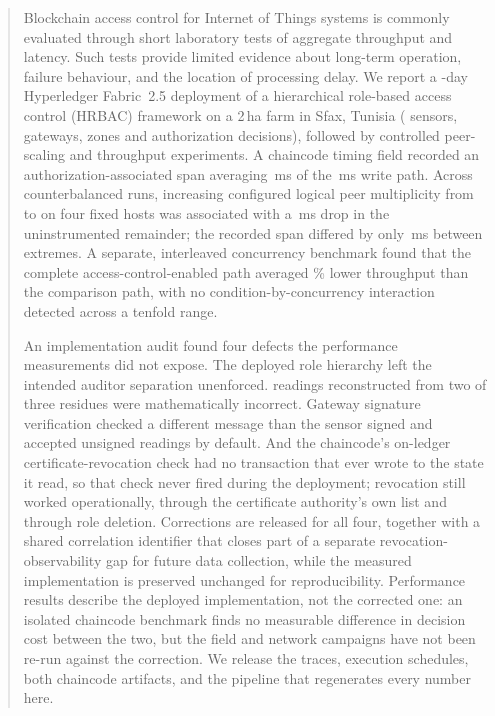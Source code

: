 \documentclass[a4paper,fleqn]{cas-sc}
\begin{document}
\begin{abstract}
Blockchain access control for Internet of Things systems is commonly
evaluated through short laboratory tests of aggregate throughput and
latency. Such tests provide limited evidence about long-term operation,
failure behaviour, and the location of processing delay. We report a
\DeployDays-day
Hyperledger Fabric~2.5 deployment of a hierarchical role-based access
control (HRBAC) framework on a 2\,ha farm in Sfax, Tunisia
(\DeploySensors{} sensors, \DeployGateways{} gateways, \DeployZones{}
zones and \TotalDecisions{} authorization decisions), followed by
controlled peer-scaling and throughput experiments. A chaincode
timing field recorded an authorization-associated span averaging
\PartAccess\,ms of the \PartTotal\,ms write path. Across
\PartRunsPerConfig{} counterbalanced runs, increasing configured logical
peer multiplicity from \ScaleMinPeers{} to \ScaleMaxPeers{} on four fixed
hosts was associated with a \PartEndorser\,ms drop in the uninstrumented
remainder; the recorded span differed by only \PartTostDiff\,ms between
extremes. A separate, interleaved concurrency benchmark
found that the complete access-control-enabled path averaged
\OverheadMeanPct\% lower throughput than the comparison path, with no
condition-by-concurrency interaction detected across a tenfold range.

An implementation audit found four defects the performance measurements did
not expose. The deployed role hierarchy left the intended auditor
separation unenforced. \CRTRecovered{} readings reconstructed from two of
three residues were mathematically incorrect. Gateway signature
verification checked a different message than the sensor signed and
accepted unsigned readings by default. And the chaincode's on-ledger
certificate-revocation check had no transaction that ever wrote to the
state it read, so that check never fired during the deployment; revocation
still worked operationally, through the certificate authority's own list
and through role deletion. Corrections are released for all four, together
with a shared correlation identifier that closes part of a separate
revocation-observability gap for future data collection, while the measured
implementation is preserved unchanged for reproducibility. Performance
results describe the deployed implementation, not the corrected one: an
isolated chaincode benchmark finds no measurable difference in decision
cost between the two, but the field and network campaigns have not been
re-run against the correction. We release the traces, execution schedules,
both chaincode artifacts, and the pipeline that regenerates every number
here.
\end{abstract}
\end{document}
